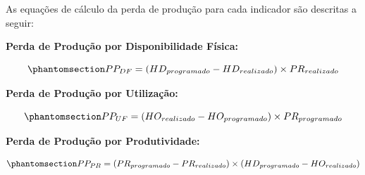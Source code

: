 \documentclass[
  letterpaper,
]{book}
\begin{document}
As equações de cálculo da perda de produção para cada indicador são
descritas a seguir:

\textbf{Perda de Produção por Disponibilidade Física:}

\begin{equation}\phantomsection\label{eq-perda-df}{
PP_{DF} = (HD_{programado} - HD_{realizado}) \times PR_{realizado}
}\end{equation}

\textbf{Perda de Produção por Utilização:}

\begin{equation}\phantomsection\label{eq-perda-uf}{
PP_{UF} = (HO_{realizado} - HO_{programado}) \times PR_{programado}
}\end{equation}

\textbf{Perda de Produção por Produtividade:}

\begin{equation}\phantomsection\label{eq-perda-pr}{
PP_{PR} = (PR_{programado} - PR_{realizado}) \times (HD_{programado} - HO_{realizado})
}\end{equation}
\end{document}
